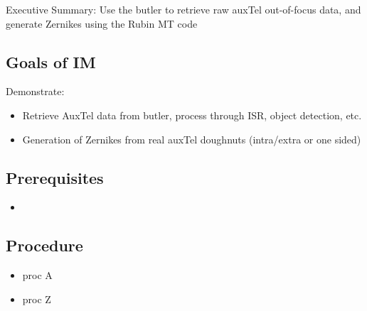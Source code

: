 
Executive Summary:
Use the butler to retrieve raw auxTel out-of-focus data, and generate Zernikes
using the Rubin MT code

\subsection{Goals of IM}
Demonstrate:
\begin{itemize}
\item Retrieve AuxTel data from butler, process through ISR, object detection, etc.
\item Generation of Zernikes from real auxTel doughnuts (intra/extra or one sided)
\end{itemize}

\subsection{Prerequisites}
\begin{itemize}
\item {}
\end{itemize}

\subsection{Procedure}
\begin{itemize}
\item proc A
\item proc Z
\end{itemize}
